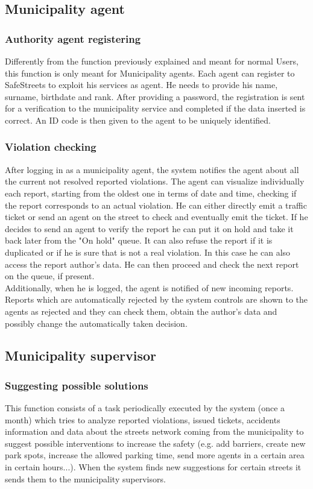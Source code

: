 \documentclass[a4paper]{report}
\begin{document}
\subsection{Municipality agent}
\label{sub-agentfun}
\subsubsection{Authority agent registering}
Differently from the function previously explained and meant for normal Users, this function is only meant for Municipality agents. Each agent can register to SafeStreets to exploit his services as agent. He needs to provide his name, surname, birthdate and rank. After providing a password, the registration is sent for a verification to the municipality service and completed if the data inserted is correct. An ID code is then given to the agent to be uniquely identified.

\subsubsection{Violation checking}
After logging in as a municipality agent, the system notifies the agent about all the current not resolved reported violations. The agent can visualize individually each report, starting from the oldest one in terms of date and time, checking if the report corresponds to an actual violation. He can either directly emit a traffic ticket or send an agent on the street to check and eventually emit the ticket.  If he decides to send an agent to verify the report he can put it on hold and take it back later from the "On hold" queue. It can also refuse the report if it is duplicated or if he is sure that is not a real violation. In this case he can also access the report author's data. He can then proceed and check the next report on the queue, if present.\\
Additionally, when he is logged, the agent is notified of new incoming reports.\\
Reports which are automatically rejected by the system controls are shown to the agents as rejected and they can check them, obtain the author's data and possibly change the automatically taken decision.

\subsection{Municipality supervisor}

\subsubsection{Suggesting possible solutions} 
This function consists of a task periodically executed by the system (once a month) which tries to analyze reported violations, issued tickets, accidents information and data about the streets network coming from the municipality to suggest possible interventions to increase the safety (e.g. add barriers, create new park spots, increase the allowed parking time, send more agents in a certain area in certain hours...). When the system finds new suggestions for certain streets it sends them to the municipality supervisors.
\end{document}
